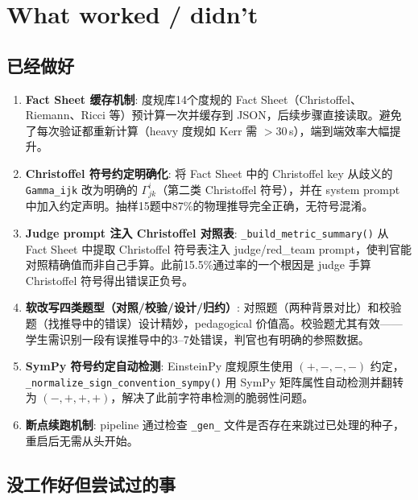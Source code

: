 \documentclass[11pt,a4paper]{article}
\begin{document}
\section{What worked / didn't}

\subsection{已经做好}

\begin{enumerate}[nosep]
  \item \textbf{Fact Sheet 缓存机制}: 度规库14个度规的 Fact Sheet（Christoffel、Riemann、Ricci 等）预计算一次并缓存到 JSON，后续步骤直接读取。避免了每次验证都重新计算（heavy 度规如 Kerr 需 $>$30\,s），端到端效率大幅提升。

  \item \textbf{Christoffel 符号约定明确化}: 将 Fact Sheet 中的 Christoffel key 从歧义的 \texttt{Gamma\_ijk} 改为明确的 $\Gamma^i_{jk}$（第二类 Christoffel 符号），并在 system prompt 中加入约定声明。抽样15题中87\%的物理推导完全正确，无符号混淆。

  \item \textbf{Judge prompt 注入 Christoffel 对照表}: \texttt{\_build\_metric\_summary()} 从 Fact Sheet 中提取 Christoffel 符号表注入 judge/red\_team prompt，使判官能对照精确值而非自己手算。此前15.5\%通过率的一个根因是 judge 手算 Christoffel 符号得出错误正负号。

  \item \textbf{软改写四类题型（对照/校验/设计/归约）}: 对照题（两种背景对比）和校验题（找推导中的错误）设计精妙，pedagogical 价值高。校验题尤其有效——学生需识别一段有误推导中的3--7处错误，判官也有明确的参照数据。

  \item \textbf{SymPy 符号约定自动检测}: EinsteinPy 度规原生使用 $(+,-,-,-)$ 约定，\texttt{\_normalize\_sign\_convention\_sympy()} 用 SymPy 矩阵属性自动检测并翻转为 $(-,+,+,+)$，解决了此前字符串检测的脆弱性问题。

  \item \textbf{断点续跑机制}: pipeline 通过检查 \texttt{\_gen\_} 文件是否存在来跳过已处理的种子，重启后无需从头开始。
\end{enumerate}

\subsection{没工作好但尝试过的事}
\end{document}
